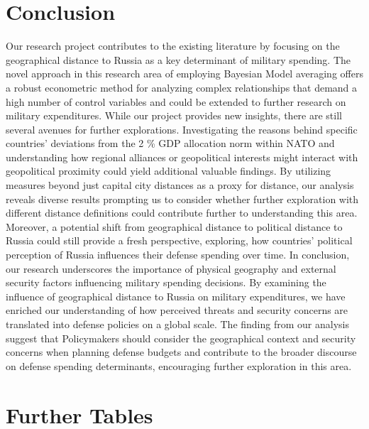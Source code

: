 \documentclass[12pt,a4paper]{article}
\begin{document}
\section{Conclusion}

Our research project contributes to the existing literature by focusing on the geographical distance to Russia as a key determinant of military spending. The novel approach in this research area of employing Bayesian Model averaging offers a robust econometric method for analyzing complex relationships that demand a high number of control variables and could be extended to further research on military expenditures. 
While our project provides new insights, there are still several avenues for further explorations. Investigating the reasons behind specific countries’ deviations from the 2 \% GDP allocation norm within NATO and understanding how regional alliances or geopolitical interests might interact with geopolitical proximity could yield additional valuable findings. 
By utilizing measures beyond just capital city distances as a proxy for distance, our analysis reveals diverse results prompting us to consider whether further exploration with different distance definitions could contribute further to understanding this area. Moreover, a potential shift from geographical distance to political distance to Russia could still provide a fresh perspective, exploring, how countries’ political perception of Russia influences their defense spending over time.
In conclusion, our research underscores the importance of physical geography and external security factors influencing military spending decisions. By examining the influence of geographical distance to Russia on military expenditures, we have enriched our understanding of how perceived threats and security concerns are translated into defense policies on a global scale. The finding from our analysis suggest that Policymakers should consider the geographical context and security concerns when planning defense budgets and contribute to the broader discourse on defense spending determinants, encouraging further exploration in this area.




\clearpage


\setcounter{page}{\thesavepage}
\pagestyle{plain}


\clearpage
\appendix
\section{Further Tables}
\label{Appendix Tables}
\end{document}
